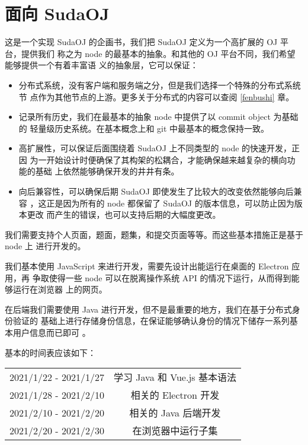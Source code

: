 
\section{面向 SudaOJ}
这是一个实现 SudaOJ 的企画书，我们把 SudaOJ 定义为一个高扩展的 OJ 平台，提供我们
称之为 node 的最基本的抽象。和其他的 OJ 平台不同，我们希望能够提供一个有着丰富语
义的抽象层，它可以保证：

\begin{itemize}
    \item 分布式系统，没有客户端和服务端之分，但是我们选择一个特殊的分布式系统节
        点作为其他节点的上游。更多关于分布式的内容可以查阅 \ref{fenbushi} 章。
    \item 记录所有历史，我们在最基本的抽象 node 中提供了以 commit object 为基础的
        轻量级历史系统。在基本概念上和 git 中最基本的概念保持一致。
    \item 高扩展性，可以保证后面围绕着 SudaOJ 上不同类型的 node 的快速开发，正因
        为一开始设计时便确保了其构架的松耦合，才能确保越来越复杂的横向功能的基础
        上依然能够确保开发的井井有条。
    \item 向后兼容性，可以确保后期 SudaOJ 即使发生了比较大的改变依然能够向后兼容
        ，这正是因为所有的 node 都保留了 SudaOJ 的版本信息，可以防止因为版本更改
        而产生的错误，也可以支持后期的大幅度更改。
\end{itemize}

我们需要支持个人页面，题面，题集，和提交页面等等。而这些基本措施正是基于 node 上
进行开发的。

我们基本使用 JavaScript 来进行开发，需要先设计出能运行在桌面的 Electron 应用，再
争取使得一些 node 可以在脱离操作系统 API 的情况下运行，从而得到能够运行在浏览器
上的网页。

在后端我们需要使用 Java 进行开发，但不是最重要的地方，我们在基于分布式身份验证的
基础上进行存储身份信息，在保证能够确认身份的情况下储存一系列基本用户信息而已即可
。

基本的时间表应该如下：

\begin{center}
\begin{tabular}{cc}
    \hline
    2021/1/22 - 2021/1/27 & 学习 Java 和 Vue.js 基本语法 \\
    2021/1/28 - 2021/2/10 & 相关的 Electron 开发 \\
    2021/2/10 - 2021/2/20 & 相关的 Java 后端开发 \\
    2021/2/20 - 2021/2/30 & 在浏览器中运行子集 \\
    \hline
\end{tabular}
\end{center}



